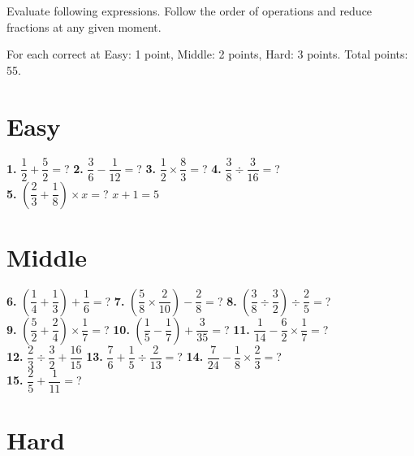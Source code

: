 \documentclass[a4paper]{article}
\newcommand{\lr}[1]{\left({#1}\right)} %
\begin{document}
\begin{Large}

Evaluate following expressions. Follow the order of operations and reduce fractions at any given moment.

For each correct at Easy: 1 point, Middle: 2 points, Hard: 3 points. Total points: 55.

\section* {Easy}
		
\textbf{1.} $\dfrac{1}{2} + \dfrac 52 =$? \hspace{0.3cm}
\textbf{2.} $\dfrac{3}{6} - \dfrac {1}{12} =$? \hspace{0.3cm}
\textbf{3.} $\dfrac{1}{2} \times \dfrac {8}{3}=$? \hspace{0.3cm}
\textbf{4.} $\dfrac{3}{8} \div \dfrac {3}{16}=$? \\[0.75cm]
\textbf{5.} $\lr{\dfrac{2}{3} + \dfrac 18} \times x=$? \hspace{0.3cm} 
$x + 1 = 5$


\section* {Middle}
		
\textbf{6.} $\lr{\dfrac{1}{4} + \dfrac{1}{3}} + \dfrac{1}{6}=$? \hspace{0.3cm}
\textbf{7.} $\lr{\dfrac{5}{8} \times \dfrac{2}{10}} - \dfrac{2}{8}=$? \hspace{0.3cm}
\textbf{8.} $\lr{\dfrac{3}{8} \div \dfrac{3}{2}} \div \dfrac{2}{5}=$? \\[0.75cm]
\textbf{9.} $\lr{\dfrac{5}{2} + \dfrac{2}{4}} \times \dfrac{1}{7}=$? \hspace{0.3cm}
\textbf{10.} $\lr{\dfrac{1}{5} - \dfrac{1}{7}} + \dfrac{3}{35}=$? \hspace{0.3cm} 
\textbf{11.} $\dfrac{1}{14} - \dfrac{6}{2} \times \dfrac{1}{7}=$? \\[0.75cm]
\textbf{12.} $\dfrac{2}{3} \div \dfrac{3}{2} + \dfrac{16}{15}$ \hspace{0.3cm}
\textbf{13.} $\dfrac{7}{6} + \dfrac{1}{5} \div \dfrac{2}{13}=$? \hspace{0.3cm}
\textbf{14.} $\dfrac{7}{24} - \dfrac{1}{8} \times \dfrac{2}{3}=$? \\[0.75cm]
\textbf{15.} $\dfrac{2}{5} + \dfrac{1}{11}=$?
		
\section* {Hard}


\end{Large}
\end{document}
